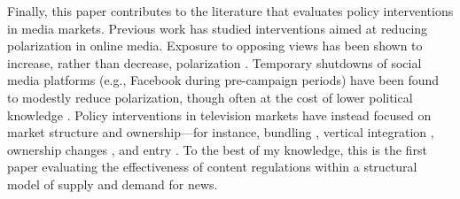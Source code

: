 \documentclass[12pt]{article}
\begin{document}
Finally, this paper contributes to the literature that evaluates policy interventions in media markets. Previous work has studied interventions aimed at reducing polarization in online media. Exposure to opposing views has been shown to increase, rather than decrease, polarization \citep{bail2018exposure}. Temporary shutdowns of social media platforms (e.g., Facebook during pre-campaign periods) have been found to modestly reduce polarization, though often at the cost of lower political knowledge \citep{Allcott2024TheEO}. Policy interventions in television markets have instead focused on market structure and ownership—for instance, bundling \citep{crawford_yurukoglu}, vertical integration \citep{crawford_vertical}, ownership changes \citep{MARTIN_McCRAIN_2019,CageHengelHerveUrvoy2022}, and entry \citep{prat_stromberg_entry}. To the best of my knowledge, this is the first paper evaluating the effectiveness of content regulations within a structural model of supply and demand for news.
\end{document}
